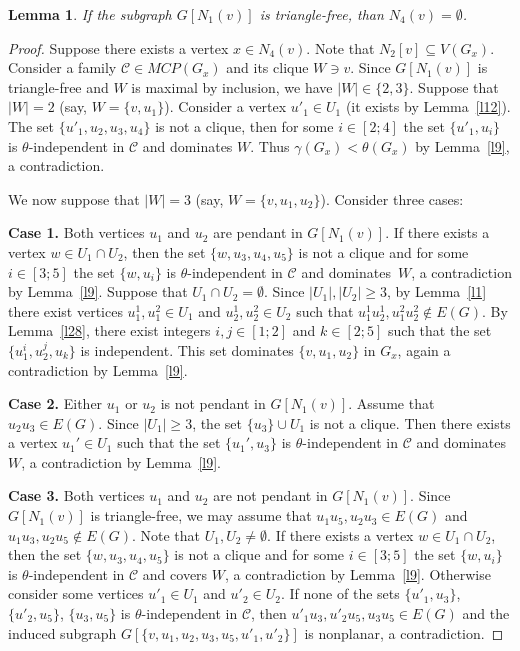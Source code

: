 \documentclass[12pt]{article}
\newtheorem{lemma}{Lemma}
\begin{document}
\begin{lemma}\label{l29}
If the subgraph $G[N_1(v)]$ is triangle-free, than $N_4(v) = \emptyset$. 
\end{lemma}

\begin{proof}
Suppose there exists a vertex $x \in N_4(v)$. Note that $N_2[v] \subseteq V(G_x)$. Consider a family $\mathcal{C} \in MCP(G_x)$ and its clique $W \ni v$. Since $G[N_1(v)]$ is triangle-free and $W$ is maximal by inclusion, we have $|W| \in \{2,3\}$. Suppose that $|W| = 2$ (say, $W = \{v,u_1\}$). Consider a vertex $u'_1 \in U_1$ (it exists by Lemma~\ref{l12}). The set $\{u'_1,u_2,u_3,u_4\}$ is not a clique, then for some $i \in [2;4]$ the set $\{u'_1,u_i\}$ is $\theta$-independent in $\mathcal{C}$ and dominates $W$. Thus $\gamma(G_x) < \theta(G_x)$ by Lemma~\ref{l9}, a contradiction.

We now suppose that $|W| = 3$ (say, $W = \{v,u_1,u_2\}$). Consider three cases:

\textbf{Case 1.} Both vertices $u_1$ and $u_2$ are pendant in $G[N_1(v)]$. If there exists a vertex $w \in U_1 \cap U_2$, then the set $\{w,u_3,u_4,u_5\}$ is not a clique and for some $i \in [3;5]$ the set $\{w,u_i\}$ is $\theta$-independent in $\mathcal{C}$ and dominates~$W$, a contradiction by Lemma~\ref{l9}. Suppose that $U_1 \cap U_2 = \emptyset$. Since $|U_1|, |U_2| \geq 3$, by Lemma~\ref{l1} there exist vertices $u_1^{1},u_1^{2} \in U_1$ and $u_2^{1},u_2^{2} \in U_2$ such that $u_1^1u_2^1,u_1^2u_2^2 \notin E(G)$. By Lemma~\ref{l28}, there exist integers $i,j \in [1;2]$ and $k \in [2;5]$ such that the set $\{u_1^{i},u_2^{j},u_k\}$ is independent. This set dominates $\{v,u_1,u_2\}$ in $G_x$, again a contradiction by Lemma~\ref{l9}.

\textbf{Case 2.} Either $u_1$ or $u_2$ is not pendant in $G[N_1(v)]$. Assume that $u_2u_3 \in E(G)$. Since $|U_1| \geq 3$, the set $\{u_3\} \cup U_1$ is not a clique. Then there exists a vertex $u_1' \in U_1$ such that the set $\{u_1',u_3\}$ is $\theta$-independent in $\mathcal{C}$ and dominates $W$, a contradiction by Lemma~\ref{l9}.

\textbf{Case 3.} Both vertices $u_1$ and $u_2$ are not pendant in $G[N_1(v)]$. Since $G[N_1(v)]$ is triangle-free, we may assume  that $u_1u_5,u_2u_3 \in E(G)$ and $u_1u_3,u_2u_5 \notin E(G)$. Note that $U_1,U_2 \neq \emptyset$. If there exists a vertex $w \in U_1 \cap U_2$, then the set $\{w,u_3,u_4,u_5\}$ is not a clique and for some $i \in [3;5]$ the set $\{w,u_i\}$ is $\theta$-independent in $\mathcal{C}$ and covers $W$, a contradiction by Lemma~\ref{l9}. Otherwise consider some vertices $u'_1 \in U_1$ and $u'_2 \in U_2$. If none of the sets $\{u'_1,u_3\}$, $\{u'_2,u_5\}$, $\{u_3,u_5\}$ is $\theta$-independent in $\mathcal{C}$, then $u'_1u_3, u'_2u_5, u_3u_5 \in E(G)$ and the induced subgraph $G[\{v,u_1,u_2,u_3,u_5,u'_1,u'_2\}]$ is nonplanar, a contradiction.
\end{proof}
\end{document}
